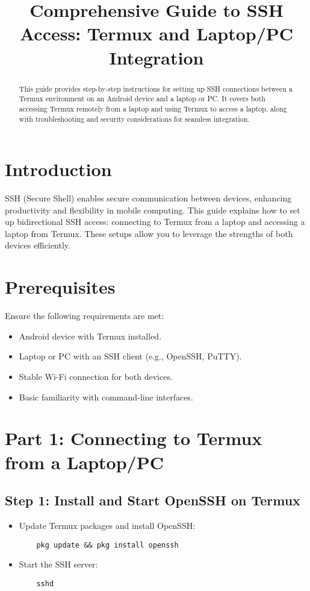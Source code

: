 \documentclass[conference]{IEEEtran}
\title{\textbf{Comprehensive Guide to SSH Access: Termux and Laptop/PC Integration}}
\author{\IEEEauthorblockN{Errala Paulsonashish}
\IEEEauthorblockA{Email: paulsonashisherrala24@gmail.com}}
\begin{document}
\maketitle

\begin{abstract}
This guide provides step-by-step instructions for setting up SSH connections between a Termux environment on an Android device and a laptop or PC. It covers both accessing Termux remotely from a laptop and using Termux to access a laptop, along with troubleshooting and security considerations for seamless integration.
\end{abstract}

\section{Introduction}
SSH (Secure Shell) enables secure communication between devices, enhancing productivity and flexibility in mobile computing. This guide explains how to set up bidirectional SSH access: connecting to Termux from a laptop and accessing a laptop from Termux. These setups allow you to leverage the strengths of both devices efficiently.

\section{Prerequisites}
Ensure the following requirements are met:
\begin{itemize}[leftmargin=*]
    \item Android device with Termux installed.
    \item Laptop or PC with an SSH client (e.g., OpenSSH, PuTTY).
    \item Stable Wi-Fi connection for both devices.
    \item Basic familiarity with command-line interfaces.
\end{itemize}

\section{Part 1: Connecting to Termux from a Laptop/PC}
\subsection{Step 1: Install and Start OpenSSH on Termux}
\begin{itemize}[leftmargin=*]
    \item Update Termux packages and install OpenSSH:
    \begin{verbatim}
    pkg update && pkg install openssh
    \end{verbatim}
    \item Start the SSH server:
    \begin{verbatim}
    sshd
    \end{verbatim}
\end{itemize}
\end{document}
